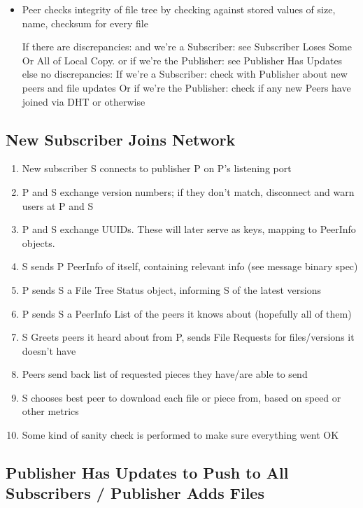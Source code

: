 \documentclass[12pt,a4paper,]{adreport}
\begin{document}
\begin{itemize}
\item
  Peer checks integrity of file tree by checking against stored values
  of size, name, checksum for every file

  If there are discrepancies: and we're a Subscriber: see Subscriber
  Loses Some Or All of Local Copy. or if we're the Publisher: see
  Publisher Has Updates else no discrepancies: If we're a Subscriber:
  check with Publisher about new peers and file updates Or if we're the
  Publisher: check if any new Peers have joined via DHT or otherwise
\end{itemize}

\subsection{New Subscriber Joins
Network}\label{new-subscriber-joins-network}

\begin{enumerate}
\def\labelenumi{\arabic{enumi}.}
\itemsep1pt\parskip0pt
\item
  New subscriber S connects to publisher P on P's listening port
\item
  P and S exchange version numbers; if they don't match, disconnect and
  warn users at P and S
\item
  P and S exchange UUIDs. These will later serve as keys, mapping to
  PeerInfo objects.
\item
  S sends P PeerInfo of itself, containing relevant info (see message
  binary spec)
\item
  P sends S a File Tree Status object, informing S of the latest
  versions
\item
  P sends S a PeerInfo List of the peers it knows about (hopefully all
  of them)
\item
  S Greets peers it heard about from P, sends File Requests for
  files/versions it doesn't have
\item
  Peers send back list of requested pieces they have/are able to send
\item
  S chooses best peer to download each file or piece from, based on
  speed or other metrics
\item
  Some kind of sanity check is performed to make sure everything went OK
\end{enumerate}

\subsection{Publisher Has Updates to Push to All Subscribers / Publisher
Adds
Files}\label{publisher-has-updates-to-push-to-all-subscribers-publisher-adds-files}
\end{document}

